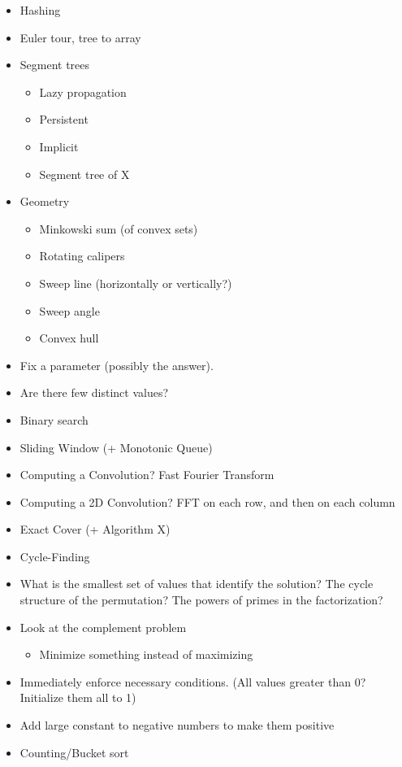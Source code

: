 \documentclass[8pt,a4paper,landscape,oneside]{amsart}
\newenvironment{myitemize}
{\begin{itemize}[leftmargin=.3cm]
	\setlength{\itemsep}{0pt}
	\setlength{\parskip}{0pt}
	\setlength{\parsep}{0pt}     }
{ \end{itemize}                  }
\begin{document}
\begin{multicols*}{3}
\begin{myitemize}
\begin{itemize}
			\item Suffix array
			\item Suffix automaton (+DP?)
			\item Aho-Corasick
			\item eerTree
			\item Work with $S+S$
		\end{itemize}
	\item Hashing
	\item Euler tour, tree to array
	\item Segment trees
		\begin{itemize}
			\item Lazy propagation
			\item Persistent
			\item Implicit
			\item Segment tree of X
		\end{itemize}
	\item Geometry
		\begin{itemize}
			\item Minkowski sum (of convex sets)
			\item Rotating calipers
			\item Sweep line (horizontally or vertically?)
			\item Sweep angle
			\item Convex hull
		\end{itemize}
	\item Fix a parameter (possibly the answer).
	\item Are there few distinct values?
	\item Binary search
	\item Sliding Window (+ Monotonic Queue)
	\item Computing a Convolution? Fast Fourier Transform
	\item Computing a 2D Convolution? FFT on each row, and then on each column
	\item Exact Cover (+ Algorithm X)
	\item Cycle-Finding
	\item What is the smallest set of values that identify the solution? The cycle structure of the permutation? The powers of primes in the factorization?
	\item Look at the complement problem
		\begin{itemize}
			\item Minimize something instead of maximizing
		\end{itemize}
	\item Immediately enforce necessary conditions. (All values greater than 0? Initialize them all to 1)
	\item Add large constant to negative numbers to make them positive
	\item Counting/Bucket sort
\end{myitemize}


\end{multicols*}
\end{document}
